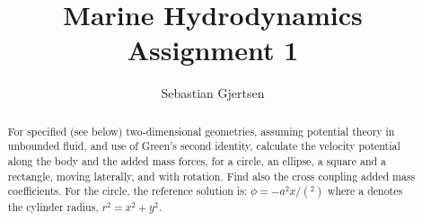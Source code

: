 \documentclass[a4paper,norsk]{article}
\begin{document}
\title{Marine Hydrodynamics \\ Assignment 1}
\author{Sebastian Gjertsen}

\maketitle

\begin{abstract}
For specified (see below) two-dimensional geometries, assuming potential theory in unbounded fluid, and use of Green's second identity, calculate the velocity potential along the body and the added mass forces, for a circle, an ellipse, a square and a rectangle, moving laterally, and with rotation. Find also the cross coupling added mass coefficients. For the circle, the reference solution is: $ \phi =-a^2x/(^2)$ where a denotes the cylinder radius, $r^2=x^2+y^2$.
\end{abstract}
\end{document}
